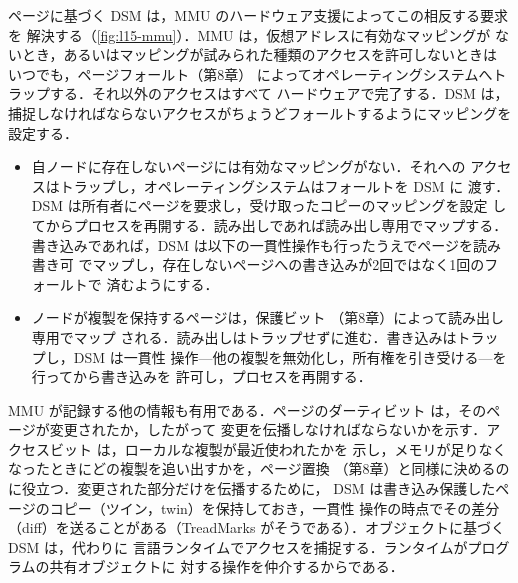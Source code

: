 \documentclass[../main.tex]{subfiles}
\begin{document}
ページに基づく DSM は，MMU のハードウェア支援によってこの相反する要求を
解決する（\cref{fig:l15-mmu}）．MMU は，仮想アドレスに有効なマッピングが
ないとき，あるいはマッピングが試みられた種類のアクセスを許可しないときは
いつでも，ページフォールト（第8章）
によってオペレーティングシステムへトラップする．それ以外のアクセスはすべて
ハードウェアで完了する．DSM は，
捕捉しなければならないアクセスがちょうどフォールトするようにマッピングを
設定する．
\begin{itemize}
  \item 自ノードに存在しないページには有効なマッピングがない．それへの
    アクセスはトラップし，オペレーティングシステムはフォールトを DSM に
    渡す．DSM は所有者にページを要求し，受け取ったコピーのマッピングを設定
    してからプロセスを再開する．読み出しであれば読み出し専用でマップする．
    書き込みであれば，DSM は以下の一貫性操作も行ったうえでページを読み書き可
    でマップし，存在しないページへの書き込みが2回ではなく1回のフォールトで
    済むようにする．
  \item ノードが複製を保持するページは，保護ビット
    （第8章）によって読み出し専用でマップ
    される．読み出しはトラップせずに進む．書き込みはトラップし，DSM は一貫性
    操作---他の複製を無効化し，所有権を引き受ける---を行ってから書き込みを
    許可し，プロセスを再開する．
\end{itemize}
MMU が記録する他の情報も有用である．ページのダーティビット
は，そのページが変更されたか，したがって
変更を伝播しなければならないかを示す．アクセスビット
は，ローカルな複製が最近使われたかを
示し，メモリが足りなくなったときにどの複製を追い出すかを，ページ置換
（第8章）と同様に決めるのに役立つ．変更された部分だけを伝播するために，
DSM は書き込み保護したページのコピー（ツイン，twin）を保持しておき，一貫性
操作の時点でその差分（diff）を送ることがある（TreadMarks
\cite{keleher1994} がそうである）．オブジェクトに基づく DSM は，代わりに
言語ランタイムでアクセスを捕捉する．ランタイムがプログラムの共有オブジェクトに
対する操作を仲介するからである．
\end{document}
